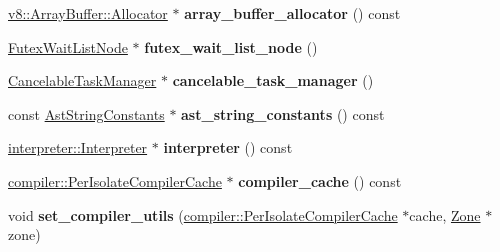 \begin{DoxyCompactItemize}
\item 
\mbox{\label{classv8_1_1internal_1_1Isolate_a24a37de78fb127d98e305ddb5e6878c1}} 
\mbox{\hyperlink{classv8_1_1ArrayBuffer_1_1Allocator}{v8\+::\+Array\+Buffer\+::\+Allocator}} $\ast$ {\bfseries array\+\_\+buffer\+\_\+allocator} () const
\item 
\mbox{\label{classv8_1_1internal_1_1Isolate_a1b279223b072f901349bc70d0decfcf0}} 
\mbox{\hyperlink{classv8_1_1internal_1_1FutexWaitListNode}{Futex\+Wait\+List\+Node}} $\ast$ {\bfseries futex\+\_\+wait\+\_\+list\+\_\+node} ()
\item 
\mbox{\label{classv8_1_1internal_1_1Isolate_a6ca088205654decf7abab43340be424a}} 
\mbox{\hyperlink{classv8_1_1internal_1_1CancelableTaskManager}{Cancelable\+Task\+Manager}} $\ast$ {\bfseries cancelable\+\_\+task\+\_\+manager} ()
\item 
\mbox{\label{classv8_1_1internal_1_1Isolate_a7bffc7b232acafd8c4b6d5c3ab05ca51}} 
const \mbox{\hyperlink{classv8_1_1internal_1_1AstStringConstants}{Ast\+String\+Constants}} $\ast$ {\bfseries ast\+\_\+string\+\_\+constants} () const
\item 
\mbox{\label{classv8_1_1internal_1_1Isolate_a4f95f2994e35d8ec739f6f6977a2cc28}} 
\mbox{\hyperlink{classv8_1_1internal_1_1interpreter_1_1Interpreter}{interpreter\+::\+Interpreter}} $\ast$ {\bfseries interpreter} () const
\item 
\mbox{\label{classv8_1_1internal_1_1Isolate_a19a54924dfcf90af8888360bf7e62bc8}} 
\mbox{\hyperlink{classv8_1_1internal_1_1compiler_1_1PerIsolateCompilerCache}{compiler\+::\+Per\+Isolate\+Compiler\+Cache}} $\ast$ {\bfseries compiler\+\_\+cache} () const
\item 
\mbox{\label{classv8_1_1internal_1_1Isolate_a4c993427bcbb6ef547df0664c9d17bb4}} 
void {\bfseries set\+\_\+compiler\+\_\+utils} (\mbox{\hyperlink{classv8_1_1internal_1_1compiler_1_1PerIsolateCompilerCache}{compiler\+::\+Per\+Isolate\+Compiler\+Cache}} $\ast$cache, \mbox{\hyperlink{classv8_1_1internal_1_1Zone}{Zone}} $\ast$zone)
\item 

\end{DoxyCompactItemize}
